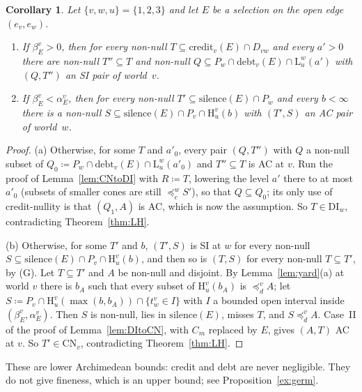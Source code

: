 \documentclass[11pt]{article}
\newtheorem{corollary}[theorem]{Corollary}
\theoremstyle{definition}\newtheorem{definition}[theorem]{Definition}
\theoremstyle{remark}\newtheorem{remark}[theorem]{Remark}
\newcommand{\debt}{\mathrm{debt}}
\newcommand{\cred}{\mathrm{credit}}
\newcommand{\sil}{\mathrm{silence}}
\newcommand{\Lo}[3]{\mathrm L^{#1}_{#2}(#3)}
\newcommand{\Hi}[3]{\mathrm H^{#1}_{#2}(#3)}
\newcommand{\CN}{\mathrm{CN}}
\newcommand{\DI}{\mathrm{DI}}
\begin{document}
\begin{corollary}\label{cor:relLH}
Let $\{v,w,u\}=\{1,2,3\}$ and let $E$ be a selection on the open edge
$(e_v,e_w)$.
\begin{enumerate}[label=(\alph*)]
\item If $\beta^v_E>0$, then for every non-null $T\subseteq\cred_v(E)\cap
D_{vw}$ and every $a'>0$ there are non-null $T''\subseteq T$ and
non-null $Q\subseteq P_w\cap\debt_v(E)\cap\Lo wu{a'}$ with $(Q,T'')$ an
SI pair of
world~$v$.
\item If $\beta^v_E<\alpha^v_E$, then for every non-null
$T'\subseteq\sil(E)\cap P_w$ and every $b<\infty$ there is a non-null
$S\subseteq\sil(E)\cap P_v\cap\Hi vub$ with $(T',S)$ an AC pair of
world~$w$.
\end{enumerate}
\end{corollary}
\begin{proof}
(a) Otherwise, for some $T$ and $a'_0$, every pair $(Q,T'')$ with $Q$ a
non-null subset of $Q_0\coloneqq P_w\cap\debt_v(E)\cap\Lo wu{a'_0}$ and
$T''\subseteq T$ is AC at $v$. Run the proof of Lemma~\ref{lem:CNtoDI} with
$R\coloneqq T$, lowering the level $a'$ there to at most $a'_0$ (subsets of
smaller cones are still $\preceq^w_cS'$), so that $Q\subseteq Q_0$; its only
use of credit-nullity is that $(Q_1,A)$ is AC, which is now the assumption.
So $T\in\DI_w$, contradicting Theorem~\ref{thm:LH}.

(b) Otherwise, for some $T'$ and $b$, $(T',S)$ is SI at $w$ for every
non-null $S\subseteq\sil(E)\cap P_v\cap\Hi vub$, and then so is $(T,S)$ for
every non-null $T\subseteq T'$, by (G). Let $T\subseteq T'$ and $A$ be
non-null and disjoint. By Lemma~\ref{lem:yard}(a) at world $v$ there is
$b_A$ such that every subset of $\Hi vu{b_A}$ is $\preceq^v_dA$; let
$S\coloneqq P_v\cap\Hi vu{\max(b,b_A)}\cap\{t^v_w\in I\}$ with $I$ a bounded
open interval inside $(\beta^v_E,\alpha^v_E)$. Then $S$ is non-null, lies in
$\sil(E)$, misses $T$, and $S\preceq^v_dA$. Case~II of the proof of
Lemma~\ref{lem:DItoCN}, with $C_m$ replaced by $E$, gives $(A,T)$ AC at $v$.
So $T'\in\CN_v$, contradicting Theorem~\ref{thm:LH}.
\end{proof}

These are lower Archimedean bounds: credit and debt are never negligible.
They do not give fineness, which is an upper bound; see
Proposition~\ref{ex:germ}.
\end{document}
